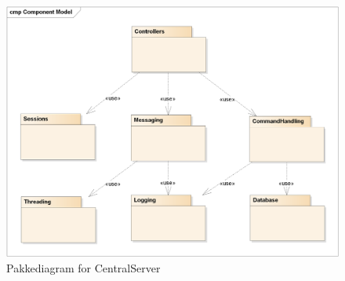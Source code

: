\begin{figure}[!hb]
    \centering
    \includegraphics[width=1\textwidth]{Systemdesign/CentralServer/Images/Packages.png}
    \caption{Pakkediagram for CentralServer}
    \label{fig:CSPackages}
\end{figure}